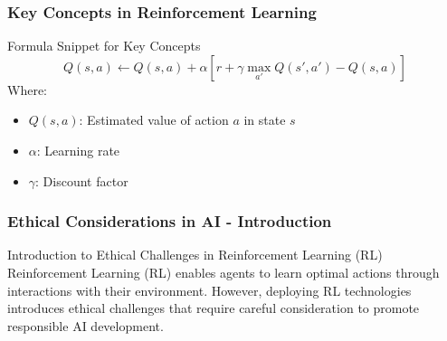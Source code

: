 \documentclass[aspectratio=169]{beamer}
\begin{document}
\begin{frame}[fragile]
    \frametitle{Key Concepts in Reinforcement Learning}
    \begin{block}{Formula Snippet for Key Concepts}
        \begin{equation}
        Q(s, a) \leftarrow Q(s, a) + \alpha \left[ r + \gamma \max_{a'} Q(s', a') - Q(s, a) \right]
        \end{equation}
        Where:
        \begin{itemize}
            \item \(Q(s, a)\): Estimated value of action \(a\) in state \(s\)
            \item \(\alpha\): Learning rate
            \item \(\gamma\): Discount factor
        \end{itemize}
    \end{block}
\end{frame}

\begin{frame}[fragile]
    \frametitle{Ethical Considerations in AI - Introduction}
    \begin{block}{Introduction to Ethical Challenges in Reinforcement Learning (RL)}
        Reinforcement Learning (RL) enables agents to learn optimal actions through interactions with their environment. However, deploying RL technologies introduces ethical challenges that require careful consideration to promote responsible AI development.
    \end{block}
\end{frame}
\end{document}
